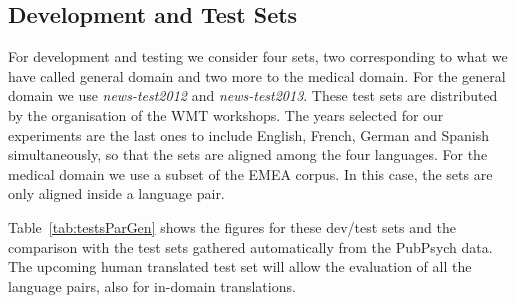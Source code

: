 \documentclass[a4paper,11pt]{article}
\begin{document}




%    


\subsection{Development and Test Sets}
\label{ss:genTests}

For development and testing we consider four sets, two corresponding to what we have called general domain and two more to the medical domain. For the general domain we use \emph{news-test2012} and \emph{news-test2013}. These test sets are distributed by the organisation of the WMT workshops. The years selected for our experiments are the last ones to include English, French, German and Spanish simultaneously, so that the sets are aligned among the four languages. For the medical domain we use a subset of the EMEA corpus. In this case, the sets are only aligned inside a language pair.

Table~\ref{tab:testsParGen} shows the figures for these dev/test sets and the comparison with the test sets gathered automatically from the PubPsych data. 
The upcoming human translated test set will allow the evaluation of all the language pairs, also for in-domain translations.
\end{document}
